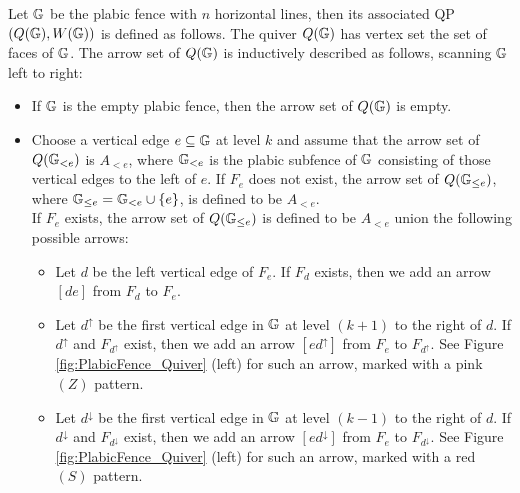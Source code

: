 \begin{definition}\label{def:quiver_plabicfence} Let $\mathbb G$ be the plabic fence with $n$ horizontal lines, then its associated QP $(Q(\mathbb G),W(\mathbb G))$ is defined as follows. The quiver $Q(\mathbb G)$ has vertex set the set of faces of $\mathbb G$. The arrow set of $Q(\mathbb G)$ is inductively described as follows, scanning $\mathbb G$ left to right:

\begin{itemize}
    \item[(i)] If $\mathbb G$ is the empty plabic fence, then the arrow set of $Q(\mathbb G)$ is empty.\\

    \item[(ii)] Choose a vertical edge $e\subseteq\mathbb G$ at level $k$ and assume that the arrow set of $Q(\mathbb G_{<e})$ is $A_{<e}$, where $\mathbb G_{<e}$ is the plabic subfence of $\mathbb G$ consisting of those vertical edges to the left of $e$. If $F_e$ does not exist, the arrow set of $Q(\mathbb G_{\leq e})$, where $\mathbb G_{\leq e}=\mathbb G_{<e}\cup\{e\}$, is defined to be $A_{<e}$.\\
    
    \noindent If $F_e$ exists, the arrow set of $Q(\mathbb G_{\leq e})$ is defined to be $A_{<e}$ union the following possible arrows:\\

    \begin{itemize}
        \item[(a)] Let $d$ be the left vertical edge of $F_e$. If $F_d$ exists, then we add an arrow $[de]$ from $F_d$ to $F_e$.\\

       \item[(b)] Let $d^\uparrow$ be the first vertical edge in $\mathbb G$ at level $(k+1)$ to the right of $d$. If $d^\uparrow$ and $F_{d^\uparrow}$ exist, then we add an arrow $[ed^\uparrow]$ from $F_e$ to $F_{d^\uparrow}$. See Figure \ref{fig:PlabicFence_Quiver} (left) for such an arrow, marked with a pink $(Z)$ pattern.\\

       \item[(c)] Let $d^\downarrow$ be the first vertical edge in $\mathbb G$ at level $(k-1)$ to the right of $d$. If $d^\downarrow$ and $F_{d^\downarrow}$ exist, then we add an arrow $[ed^\downarrow]$ from $F_e$ to $F_{d^\downarrow}$. See Figure \ref{fig:PlabicFence_Quiver} (left) for such an arrow, marked with a red $(S)$ pattern.\\
    \end{itemize}


\end{itemize}
\end{definition}

